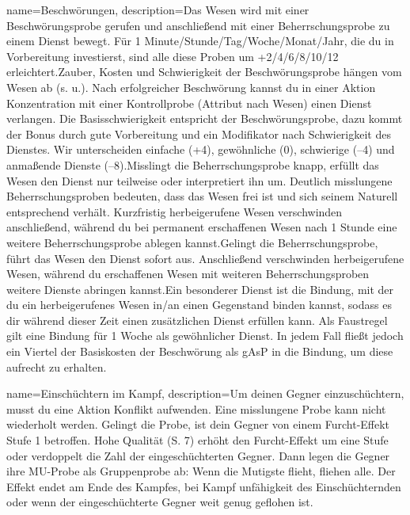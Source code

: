 {
    name={Beschwörungen},
    description={Das Wesen wird mit einer Beschwörungsprobe gerufen und anschließend mit einer Beherrschungsprobe zu einem Dienst bewegt. Für 1 Minute/Stunde/Tag/Woche/Monat/Jahr, die du in Vorbereitung investierst, sind alle diese Proben um +2/4/6/8/10/12 erleichtert.\newline     Zauber, Kosten und Schwierigkeit der Beschwörungsprobe hängen vom Wesen ab (s. u.). Nach erfolgreicher Beschwörung kannst du in einer Aktion Konzentration mit einer Kontrollprobe (Attribut nach Wesen) einen Dienst verlangen. Die Basisschwierigkeit entspricht der Beschwörungsprobe, dazu kommt der Bonus durch gute Vorbereitung und ein Modifikator nach Schwierigkeit des Dienstes. Wir unterscheiden einfache (+4), gewöhnliche (0), schwierige (–4) und anmaßende Dienste (–8).\newline     Misslingt die Beherrschungsprobe knapp, erfüllt das Wesen den Dienst nur teilweise oder interpretiert ihn um. Deutlich misslungene Beherrschungsproben bedeuten, dass das Wesen frei ist und sich seinem Naturell entsprechend verhält. Kurzfristig herbeigerufene Wesen verschwinden anschließend, während du bei permanent erschaffenen Wesen nach 1 Stunde eine weitere Beherrschungsprobe ablegen kannst.\newline     Gelingt die Beherrschungsprobe, führt das Wesen den Dienst sofort aus. Anschließend verschwinden herbeigerufene Wesen, während du erschaffenen Wesen mit weiteren Beherrschungsproben weitere Dienste abringen kannst.\newline     Ein besonderer Dienst ist die Bindung, mit der du ein herbeigerufenes Wesen in/an einen Gegenstand binden kannst, sodass es dir während dieser Zeit einen zusätzlichen Dienst erfüllen kann. Als Faustregel gilt eine Bindung für 1 Woche als gewöhnlicher Dienst. In jedem Fall fließt jedoch ein Viertel der Basiskosten der Beschwörung als gAsP in die Bindung, um diese aufrecht zu erhalten.}
}


{
    name={Einschüchtern im Kampf},
    description={Um deinen Gegner einzuschüchtern, musst du eine Aktion Konflikt aufwenden. Eine misslungene Probe kann nicht wiederholt werden. Gelingt die Probe, ist dein Gegner von einem Furcht-Effekt Stufe 1 betroffen. Hohe Qualität (S. 7) erhöht den Furcht-Effekt um eine Stufe oder verdoppelt die Zahl der eingeschüchterten Gegner. Dann legen die Gegner ihre MU-Probe als Gruppenprobe ab: Wenn die Mutigste flieht, fliehen alle. Der Effekt endet am Ende des Kampfes, bei Kampf unfähigkeit des Einschüchternden oder wenn der eingeschüchterte Gegner weit genug geflohen ist.}
}


